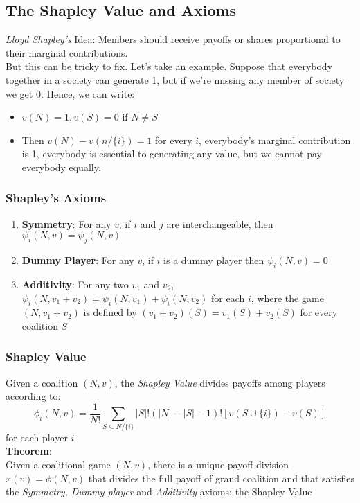 \subsection{The Shapley Value and Axioms}
\textit{Lloyd Shapley's} Idea: Members should receive payoffs or shares proportional to their marginal contributions.\\
But this can be tricky to fix. Let's take an example. Suppose that everybody together in a society can generate 1, but if we're
missing any member of society we get 0. Hence, we can write:\\
\begin{itemize}
\item $v(N) = 1, v(S)=0$ if $N\ne S$
\item Then $v(N) - v(n/\{i\}) = 1$ for every $i$, everybody's marginal contribution is 1, everybody is essential to generating any value, but we cannot pay everybody equally.
\end{itemize}
\subsubsection{Shapley's Axioms}
\begin{enumerate}
\item \textbf{Symmetry}: For any $v$, if $i$ and $j$ are interchangeable, then $\psi_i(N, v) = \psi_j(N, v)$
\item \textbf{Dummy Player}: For any $v$, if $i$ is a dummy player then $\psi_i(N, v)=0$
\item \textbf{Additivity}: For any two $v_1$ and $v_2$, $\psi_i(N, v_1 + v_2) =\psi_i(N, v_1) + \psi_i(N, v_2)$ for each $i$, where the game $(N, v_1+v_2)$ is defined by $(v_1 + v_2)(S) = v_1(S) + v_2(S)$ for every coalition $S$
\end{enumerate}
\subsubsection{Shapley Value}
Given a coalition $(N, v)$, the \textit{Shapley Value} divides payoffs among players according to:
$$\phi_i(N, v) = \frac{1}{N!}\sum_{S \subseteq N / \{i\}} |S|!(|N| - |S| - 1)! [v(S\cup \{i\})- v(S)]$$ for each player $i$\\
\textbf{Theorem}:\\

Given a coalitional game $(N, v)$, there is a unique payoff division $x(v) = \phi(N, v)$ that divides the full payoff of grand coalition and that satisfies the \textit{Symmetry, Dummy player} and \textit{Additivity} axioms: the Shapley Value

